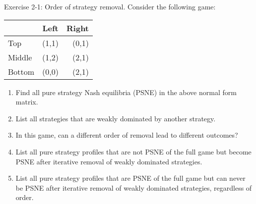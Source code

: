 \documentclass[../main.tex]{subfiles}
\begin{document}
\begin{question}
    Exercise 2-1: Order of strategy removal.
    Consider the following game:
    
    \begin{center}
	    \begin{tabular}{|l|c|r|}
	    \hline
	    & Left & Right \\
	    \hline
	    Top & (1,1) & (0,1) \\
	    \hline
	    Middle & (1,2) & (2,1) \\
	    \hline
	    Bottom & (0,0) & (2,1) \\
	    \hline
	    \end{tabular}
    \end{center}
    
    \begin{enumerate}
    	\item Find all pure strategy Nash equilibria (PSNE) in the above normal form matrix.
    	\item List all strategies that are weakly dominated by another strategy.
    	\item In this game, can a different order of removal lead to different outcomes?
    	\item List all pure strategy profiles that are not PSNE of the full game but become PSNE after iterative removal of weakly dominated strategies.
    	\item List all pure strategy profiles that are PSNE of the full game but can never be PSNE after iterative removal of weakly dominated strategies, regardless of order.
    \end{enumerate}
   
\end{question}
\end{document}
